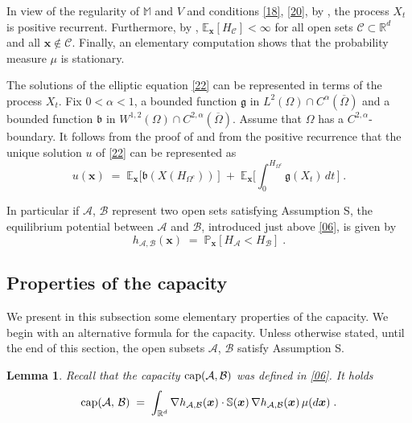 \documentclass[reqno]{amsart}
\newtheorem{lemma}[theorem]{Lemma}
\newcounter{as}[section]
\newcommand{\mc}[1]{{\mathcal #1}}
\newcommand{\mf}[1]{{\mathfrak #1}}
\newcommand{\bb}[1]{{\mathbb #1}}
\newcommand{\bs}[1]{{\boldsymbol #1}}
\newcommand{\<}{\langle}
\renewcommand{\>}{\rangle}
\renewcommand{\Cap}{{\rm cap}}
\begin{document}
In view of the regularity of $\bb M$ and $V$ and conditions \eqref{18}, \eqref{20}, by \cite[Theorem~6.1.3]{p95}, the process $X_t$ is positive recurrent. Furthermore, by \cite[Theorem~4.9.6]{p95}, $\bb E_{\bs x} [H_\mc C]<\infty$ for all open sets $\mc
C\subset \bb R^d$ and all $\bs x\not\in \mc C$. Finally, an elementary computation shows that the probability measure $\mu$ is stationary.

The solutions of the elliptic equation \eqref{22} can be represented
in terms of the process $X_t$.  Fix $0<\alpha<1$, a bounded function
$\mf g$ in $L^2(\Omega) \cap C^{\alpha}(\overline{\Omega})$ and a
bounded function $\mf b$ in $W^{1,2}(\Omega)\cap
C^{2,\alpha}(\overline{\Omega})$.  Assume that $\Omega$ has a
$C^{2,\alpha}$-boundary.  It follows from the proof of \cite[Theorem
6.5.1]{f} and from the positive recurrence that the unique solution
$u$ of \eqref{22} can be represented as
\begin{equation}
\label{23}
u(\bs{x}) \;=\; \bb E_{\bs x} \big[ \mf b (X (H_{\Omega^c}))\, \big]
\;+\; \bb E_{\bs x} \Big[ \int_0^{H_{\Omega^c}} \mf g (X_t) \,
dt \, \Big]\;.
\end{equation}

In particular if $\mc A$, $\mc B$ represent two open sets satisfying
Assumption S, the equilibrium potential between $\mc A$ and $\mc B$,
introduced just above \eqref{06}, is given by
\begin{equation}
\label{30}
h_{\mc A,\mc B} (\bs{x}) \;=\; \bb P_{\bs x} [H_\mc A<H_\mc B]\;.
\end{equation}

\subsection{Properties of the capacity}

We present in this subsection some elementary properties of the
capacity.  We begin with an alternative formula for the
capacity. Unless otherwise stated, until the end of this section, the
open subsets $\mc A$, $\mc B$ satisfy Assumption S.

\begin{lemma}
\label{lem1}
Recall that the capacity $\Cap(\mc A,\mc B)$ was defined in \eqref{06}. It holds
\begin{equation*}
\Cap (\mc A,\,\mc B) \;=\; \int_{\bb R^d}
\nabla h_{\mc A,\mc B}(\bs{x}) \cdot \bb S(\bs{x}) \, \nabla
h_{\mc A,\mc B}(\bs{x}) \, \mu(d\bs{x})\;.
\end{equation*}
\end{lemma}
\end{document}
